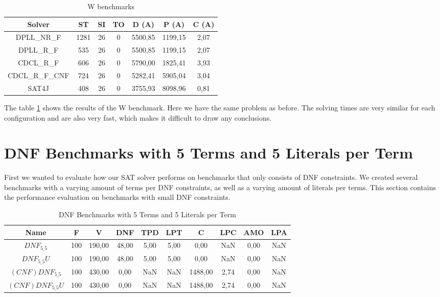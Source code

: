 \begin{table}[!htb]
\centering
\caption{W benchmarks}
\label{tab:wBenchmarks}
\begin{tabular}{|c|c|c|c|c|c|c|}
\hline
Solver & ST & SI & TO & D (A) & P (A) & C (A)\\
\hline
DPLL\_NR\_F & 1281 & 26 & 0 & 5500,85 & 1199,15 & 2,07 \\
\hline
DPLL\_R\_F & 535 & 26 & 0 & 5500,85 & 1199,15 & 2,07 \\
\hline
CDCL\_R\_F & 606 & 26 & 0 & 5790,00 & 1825,41 & 3,93 \\
\hline
CDCL\_R\_F\_CNF & 724 & 26 & 0 & 5282,41 & 5905,04 & 3,04 \\
\hline
SAT4J & 408 & 26 & 0 & 3755,93 & 8098,96 & 0,81 \\
\hline
\end{tabular}
\end{table}

The table \ref{tab:wBenchmarks} shows the results of the W benchmark. Here we have the same problem as before. The solving times are very similar for each configuration and are also very fast, which makes it difficult to draw any conclusions.

\section{DNF Benchmarks with 5 Terms and 5 Literals per Term}

First we wanted to evaluate how our SAT solver performs on benchmarks that only consists of DNF constraints. We created several benchmarks with a varying amount of terms per DNF constraints, as well as a varying amount of literals per terms. This section contains the performance evaluation on benchmarks with small DNF constraints.

\begin{table}[!htb]
\centering
\caption{DNF Benchmarks with 5 Terms and 5 Literals per Term}
\label{tab:dnf55}
\begin{tabular}{|c|c|c|c|c|c|c|c|c|c|}
\hline
Name & F & V & DNF & TPD & LPT & C & LPC & AMO & LPA \\
\hline
$DNF_{5\_5}$ & 100 & 190,00 & 48,00 & 5,00 & 5,00 & 0,00 & NaN & 0,00 & NaN \\ 
 \hline 
$DNF_{5\_5}U$ & 100 & 190,00 & 48,00 & 5,00 & 5,00 & 0,00 & NaN & 0,00 & NaN \\ 
 \hline 
$(CNF)DNF_{5\_5}$ & 100 & 430,00 & 0,00 & NaN & NaN & 1488,00 & 2,74 & 0,00 & NaN \\ 
 \hline 
$(CNF)DNF_{5\_5}U$ & 100 & 430,00 & 0,00 & NaN & NaN & 1488,00 & 2,74 & 0,00 & NaN \\ 
 \hline 
\end{tabular}
\end{table}

